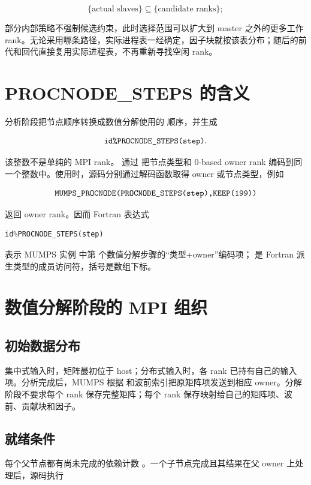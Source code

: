\[
\{\text{actual slaves}\}\subseteq\{\text{candidate ranks}\};
\]

部分内部策略不强制候选约束，此时选择范围可以扩大到 master 之外的更多工作 rank。无论采用哪条路径，实际进程表一经确定，因子块就按该表分布；随后的前代和回代直接复用实际进程表，不再重新寻找空闲 rank\cite{mumpssource}。

\section{PROCNODE\_STEPS 的含义}

分析阶段把节点顺序转换成数值分解使用的  顺序，并生成

\[
\texttt{id\%PROCNODE\_STEPS(step)}.
\]

该整数不是单纯的 MPI rank。 通过  把节点类型和 0-based owner rank 编码到同一个整数中。使用时，源码分别通过解码函数取得 owner 或节点类型，例如

\[
\texttt{MUMPS\_PROCNODE(PROCNODE\_STEPS(step),KEEP(199))}
\]

返回 owner rank。因而 Fortran 表达式

\begin{lstlisting}[language=Fortran]
id%PROCNODE_STEPS(step)
\end{lstlisting}

表示 MUMPS 实例  中第  个数值分解步骤的“类型+owner”编码项；\code{\%} 是 Fortran 派生类型的成员访问符，括号是数组下标。

\section{数值分解阶段的 MPI 组织}

\subsection{初始数据分布}

集中式输入时，矩阵最初位于 host；分布式输入时，各 rank 已持有自己的输入项。分析完成后，MUMPS 根据  和波前索引把原矩阵项发送到相应 owner。分解阶段不要求每个 rank 保存完整矩阵；每个 rank 保存映射给自己的矩阵项、波前、贡献块和因子。

\subsection{就绪条件}

每个父节点都有尚未完成的依赖计数 。一个子节点完成且其结果在父 owner 上处理后，源码执行

